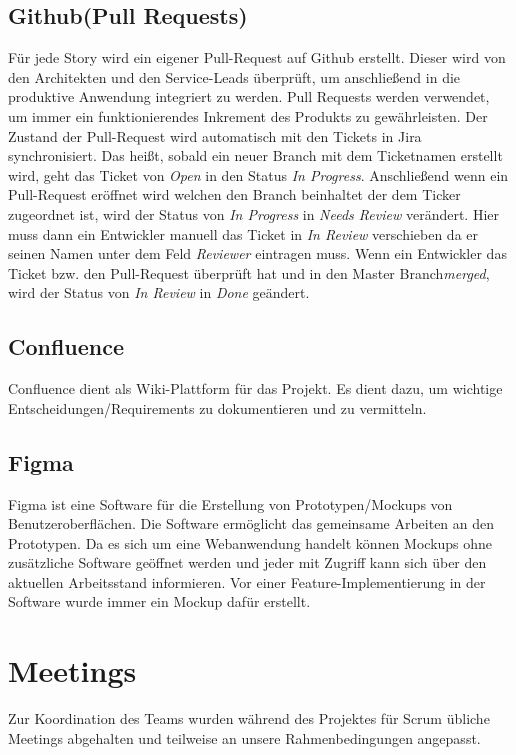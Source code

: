 \subsection{Github(Pull Requests)}
    Für jede Story wird ein eigener Pull-Request auf Github erstellt. Dieser wird von den Architekten und den Service-Leads überprüft, um anschließend in die
    produktive Anwendung integriert zu werden.  Pull Requests werden verwendet, um immer ein funktionierendes Inkrement des Produkts zu gewährleisten.
    Der Zustand der Pull-Request wird automatisch mit den Tickets in Jira synchronisiert. Das heißt, sobald ein neuer Branch mit dem Ticketnamen erstellt wird,
    geht das Ticket von \textit{Open} in den Status \textit{In Progress}. Anschließend wenn ein Pull-Request eröffnet wird welchen den Branch beinhaltet der dem Ticker zugeordnet ist,
    wird der Status von \textit{In Progress} in \textit{Needs Review} verändert. Hier muss dann ein Entwickler manuell das Ticket in \textit{In Review} verschieben da er seinen Namen unter dem Feld \textit{Reviewer}
    eintragen muss. Wenn ein Entwickler das Ticket bzw. den Pull-Request überprüft hat und in den Master Branch\textit{merged}, wird der Status von \textit{In Review} in \textit{Done} geändert.
\subsection{Confluence}
    Confluence dient als Wiki-Plattform für das Projekt. Es dient dazu, um wichtige Entscheidungen/Requirements zu dokumentieren und zu vermitteln.
\subsection{Figma}
    Figma ist eine Software für die Erstellung von Prototypen/Mockups von Benutzeroberflächen. Die Software ermöglicht das gemeinsame Arbeiten an den Prototypen. 
    Da es sich um eine Webanwendung handelt können Mockups ohne zusätzliche Software geöffnet werden und jeder mit Zugriff kann sich über den aktuellen Arbeitsstand informieren.
    Vor einer Feature-Implementierung in der Software wurde immer ein Mockup dafür erstellt.

\section{Meetings}
Zur Koordination des Teams wurden während des Projektes für Scrum übliche Meetings abgehalten und teilweise an unsere Rahmenbedingungen angepasst.

